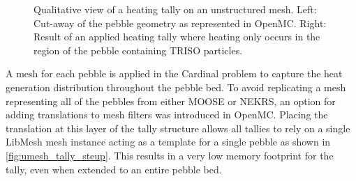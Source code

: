 \begin{figure}
    \centering
    \hspace*{.2in}
    \caption{Qualitative view of a heating tally on an unstructured mesh. Left: Cut-away of the pebble geometry as represented in OpenMC. Right: Result of an applied heating tally where heating only occurs in the region of the pebble containing TRISO particles.}
    \label{fig:pebble_umesh}
\end{figure}

A mesh for each pebble is applied in the Cardinal problem to capture the heat generation distribution throughout the pebble bed.
To avoid replicating a mesh representing all of the pebbles from either MOOSE or NEKRS, an option for adding translations to mesh filters was introduced in OpenMC.
Placing the translation at this layer of the tally structure allows all tallies to rely on a single LibMesh mesh instance acting as a template for a single pebble as shown in \autoref{fig:umesh_tally_steup}.
This results in a very low memory footprint for the tally, even when extended to an entire pebble bed.

